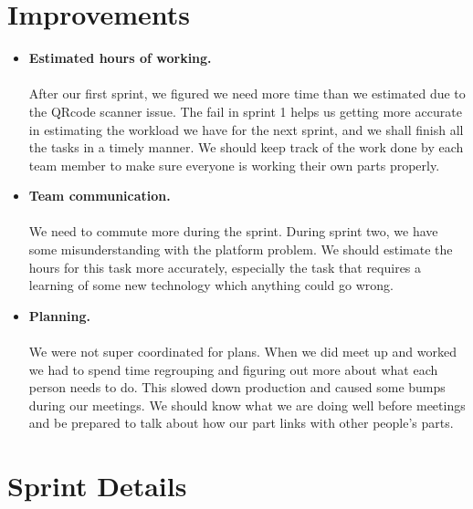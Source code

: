 \documentclass[12pt]{article}
\begin{document}
\section{Improvements}
\begin{itemize}
\item \textbf{Estimated hours of working.} \\ \\
After our first sprint, we figured we need more time than we estimated due to the QRcode scanner issue. The fail in sprint 1 helps us getting more accurate in estimating the workload we have for the next sprint, and we shall finish all the tasks in a timely manner.
We should keep track of the work done by each team member to make sure everyone is working their own parts properly. 

\item \textbf{Team communication.} \\ \\
We need to commute more during the sprint. During sprint two, we have some misunderstanding with the platform problem. We should estimate the hours for this task more accurately, especially the task that requires a learning of some new technology which anything could go wrong.


\item \textbf{Planning.} \\ \\
We were not super coordinated for plans. When we did meet up and worked we had to spend time regrouping and figuring out more about what each person needs to do. This slowed down production and caused some bumps during our meetings. We should know what we are doing well before meetings and be prepared to talk about how our part links with other people’s parts.
\end{itemize}


\section{Sprint Details}

\end{document}
